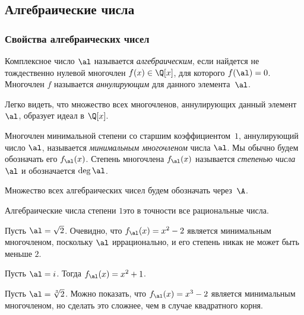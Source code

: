 \documentclass[a4paper]{article}
\begin{document}
\subsection{Алгебраические числа}

\subsubsection{Свойства алгебраических чисел}

\begin{df}
Комплексное число $\al$ называется \emph{алгебраическим}, если найдется не тождественно нулевой многочлен
$f(x)\in\Q[x]$, для которого $f(\al)=0$. Многочлен $f$ называется \emph{аннулирующим} для данного элемента~$\al$.
\end{df}

Легко видеть, что множество всех многочленов, аннулирующих данный элемент $\al$,
образует идеал в $\Q[x]$.


\begin{df}
Многочлен минимальной степени со старшим коэффициентом~$1$, аннулирующий число $\al$, называется
\emph{минимальным многочленом} числа $\al$. Мы обычно будем обозначать его $f_{\al}(x)$.
Степень многочлена $f_{\al}(x)$ называется \emph{степенью числа}~$\al$ и обозначается
$\deg\al$.
\end{df}

Множество всех алгебраических чисел будем обозначать через~$\A$.

\begin{ex}
Алгебраические числа степени $1$\т это в точности все рациональные числа.
\end{ex}

\begin{ex}
Пусть $\al=\sqrt{2}$. Очевидно, что $f_{\al}(x)=x^2-2$ является минимальным многочленом,
поскольку $\al$ иррационально, и его степень никак не может быть меньше $2$.
\end{ex}

\begin{ex}
Пусть $\al=i$. Тогда $f_{\al}(x)=x^2+1$.
\end{ex}

\begin{ex}
Пусть $\al=\sqrt[3]{2}$. Можно показать, что $f_{\al}(x)=x^3-2$ является минимальным многочленом, но
сделать это сложнее, чем в случае квадратного корня.
\end{ex}
\end{document}
